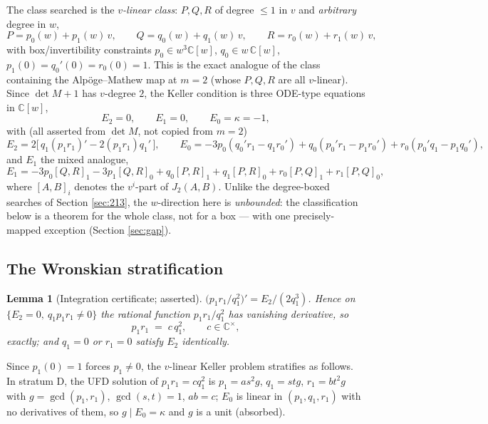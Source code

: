 \documentclass[11pt]{article}
\newtheorem{lemma}[theorem]{Lemma}
\theoremstyle{definition}
\theoremstyle{remark}
\newcommand{\C}{\mathbb{C}}
\begin{document}
The class searched is the \emph{$v$-linear class}: $P, Q, R$ of degree
$\le 1$ in $v$ and \emph{arbitrary} degree in $w$,
\[
P = p_0(w) + p_1(w)\,v,\qquad
Q = q_0(w) + q_1(w)\,v,\qquad
R = r_0(w) + r_1(w)\,v,
\]
with box/invertibility constraints $p_0 \in w^3\C[w]$,
$q_0 \in w\,\C[w]$, $p_1(0) = q_0'(0) = r_0(0) = 1$. This is the exact
analogue of the class containing the Alp\"oge--Mathew map at $m=2$
(whose $P,Q,R$ are all $v$-linear). Since $\det M + 1$ has $v$-degree
$2$, the Keller condition is three ODE-type equations in $\C[w]$,
\[
E_2 = 0,\qquad E_1 = 0,\qquad E_0 = \kappa = -1,
\]
with (all asserted from $\det M$, not copied from $m=2$)
\[
E_2 = 2\bigl[\,q_1(p_1r_1)' - 2(p_1r_1)q_1'\,\bigr],
\qquad
E_0 = -3p_0(q_0'r_1 - q_1r_0') + q_0(p_0'r_1 - p_1r_0')
 + r_0(p_0'q_1 - p_1q_0'),
\]
and $E_1$ the mixed analogue,
\[
E_1 = -3p_0[Q,R]_1 - 3p_1[Q,R]_0 + q_0[P,R]_1 + q_1[P,R]_0
 + r_0[P,Q]_1 + r_1[P,Q]_0,
\]
where $[A,B]_i$ denotes the $v^i$-part of $J_2(A,B)$. Unlike the
degree-boxed searches of Section \ref{sec:213}, the $w$-direction here
is \emph{unbounded}: the classification below is a theorem for the whole
class, not for a box --- with one precisely-mapped exception (Section
\ref{sec:gap}).

\subsection{The Wronskian stratification}

\begin{lemma}[Integration certificate; asserted]\label{lem:wronskian}
$\bigl(p_1r_1/q_1^2\bigr)' = E_2/(2q_1^3)$. Hence on
$\{E_2 = 0,\ q_1p_1r_1 \ne 0\}$ the rational function $p_1r_1/q_1^2$ has
vanishing derivative, so
\[
p_1 r_1 \;=\; c\,q_1^2, \qquad c \in \C^\times,
\]
exactly; and $q_1 = 0$ or $r_1 = 0$ satisfy $E_2$ identically.
\end{lemma}

Since $p_1(0)=1$ forces $p_1 \ne 0$, the $v$-linear Keller problem
stratifies as follows. In stratum D, the UFD solution of
$p_1r_1 = cq_1^2$ is $p_1 = as^2g$, $q_1 = stg$, $r_1 = bt^2g$ with
$g = \gcd(p_1,r_1)$, $\gcd(s,t)=1$, $ab = c$; $E_0$ is linear in
$(p_1,q_1,r_1)$ with no derivatives of them, so $g \mid E_0 = \kappa$
and $g$ is a unit (absorbed).
\end{document}

